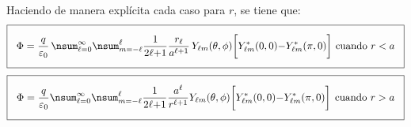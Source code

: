 Haciendo de manera explícita cada caso para $r$, se tiene que:
\begin{align*}
\setlength{\fboxsep}{3\fboxsep}\boxed{
\Phi = \dfrac{q}{\varepsilon_{0}} \,\nsum_{\ell=0}^{\infty} \nsum_{m=-\ell}^{\ell} \dfrac{1}{2 \ell {+} 1} \dfrac{r_{\ell}}{a^{\ell+1}} \, Y_{\ell m} (\theta, \phi) \bigg[ Y_{\ell m}^{*} (0, 0) {-} Y_{\ell m}^{*} (\pi, 0) \bigg] \hspace{0.12cm} \mbox{cuando } r < a }
\end{align*}
\begin{align*}
\setlength{\fboxsep}{3\fboxsep}\boxed{
\Phi = \dfrac{q}{\varepsilon_{0}} \nsum_{\ell=0}^{\infty} \nsum_{m=-\ell}^{\ell} \dfrac{1}{2 \ell {+} 1} \dfrac{a^{\ell}}{r^{\ell+1}} Y_{\ell m} (\theta, \phi) \bigg[ Y_{\ell m}^{*} (0, 0) {-} Y_{\ell m}^{*} (\pi, 0) \bigg] \hspace{0.15cm} \mbox{cuando } r > a }
\end{align*}

